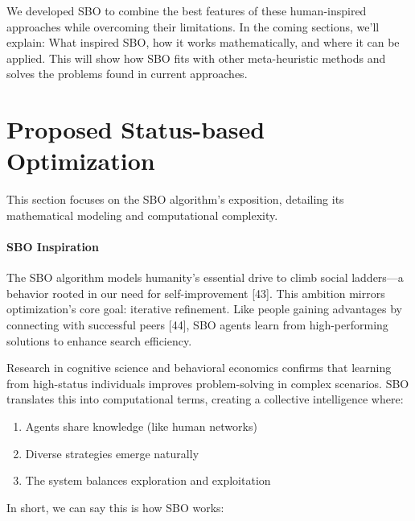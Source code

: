 \documentclass{article} %
\begin{document}
We developed SBO to combine the best features of these human-inspired approaches while overcoming their limitations. In the coming sections, we'll explain: What inspired SBO, how it works mathematically, and where it can be applied. This will show how SBO fits with other meta-heuristic methods and solves the problems found in current approaches.


\section{ Proposed Status-based Optimization}

This section focuses on the SBO algorithm's exposition, detailing its mathematical modeling and computational complexity.


\paragraph{ SBO Inspiration}

The SBO algorithm models humanity's essential drive to climb social ladders---a behavior rooted in our need for self-improvement [43]. This ambition mirrors optimization's core goal: iterative refinement. Like people gaining advantages by connecting with successful peers  [44], SBO agents learn from high-performing solutions to enhance search efficiency.

\noindent Research in cognitive science and behavioral economics confirms that learning from high-status individuals improves problem-solving in complex scenarios. SBO translates this into computational terms, creating a collective intelligence where:

\begin{enumerate}
\item  Agents share knowledge (like human networks)

\item  Diverse strategies emerge naturally

\item  The system balances exploration and exploitation
\end{enumerate}



In short, we can say this is how SBO works: 
\end{document}
